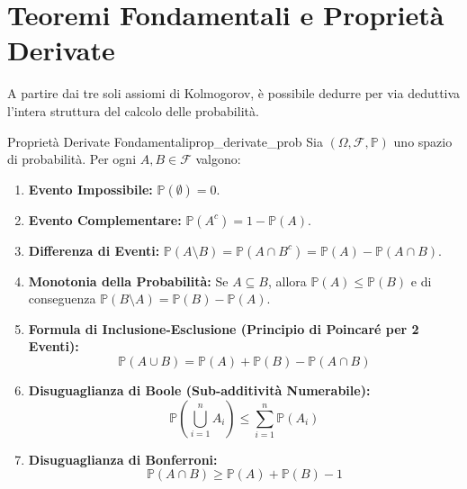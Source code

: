 \section{Teoremi Fondamentali e Proprietà Derivate}
\label{sec:teoremi_probabilita_derivati}

A partire dai tre soli assiomi di Kolmogorov, è possibile dedurre per via deduttiva l'intera struttura del calcolo delle probabilità.

\begin{teorema}{Proprietà Derivate Fondamentali}{prop_derivate_prob}
Sia $(\Omega, \mathcal{F}, \mathbb{P})$ uno spazio di probabilità. Per ogni $A, B \in \mathcal{F}$ valgono:
\begin{enumerate}
    \item \textbf{Evento Impossibile:} $\mathbb{P}(\emptyset) = 0$.
    \item \textbf{Evento Complementare:} $\mathbb{P}(A^c) = 1 - \mathbb{P}(A)$.
    \item \textbf{Differenza di Eventi:} $\mathbb{P}(A \setminus B) = \mathbb{P}(A \cap B^c) = \mathbb{P}(A) - \mathbb{P}(A \cap B)$.
    \item \textbf{Monotonia della Probabilità:} Se $A \subseteq B$, allora $\mathbb{P}(A) \le \mathbb{P}(B)$ e di conseguenza $\mathbb{P}(B \setminus A) = \mathbb{P}(B) - \mathbb{P}(A)$.
    \item \textbf{Formula di Inclusione-Esclusione (Principio di Poincaré per 2 Eventi):}
    \begin{equation}
        \mathbb{P}(A \cup B) = \mathbb{P}(A) + \mathbb{P}(B) - \mathbb{P}(A \cap B)
    \end{equation}
    \item \textbf{Disuguaglianza di Boole (Sub-additività Numerabile):}
    \begin{equation}
        \mathbb{P}\left(\bigcup_{i=1}^n A_i\right) \le \sum_{i=1}^n \mathbb{P}(A_i)
    \end{equation}
    \item \textbf{Disuguaglianza di Bonferroni:}
    \begin{equation}
        \mathbb{P}(A \cap B) \ge \mathbb{P}(A) + \mathbb{P}(B) - 1
    \end{equation}
\end{enumerate}
\end{teorema}

